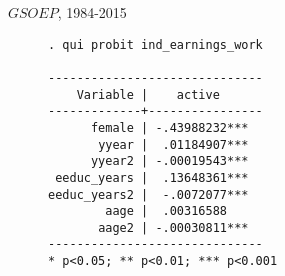 \documentclass{beamer}
\begin{document}
\begin{frame}[fragile]{$GSOEP$, 1984-2015}
\begin{figure}
\centering
\begin{minipage}[b]{0.3\textwidth}{}
\begin{Verbatim}[fontsize=\tiny]
. qui probit ind_earnings_work

------------------------------
    Variable |    active      
-------------+----------------
      female | -.43988232***  
       yyear |  .01184907***  
      yyear2 | -.00019543***  
 eeduc_years |  .13648361***  
eeduc_years2 |  -.0072077***  
        aage |  .00316588     
       aage2 | -.00030811***  
------------------------------
* p<0.05; ** p<0.01; *** p<0.001

\end{Verbatim}
\end{minipage}
\end{figure}
\end{frame}
\end{document}
